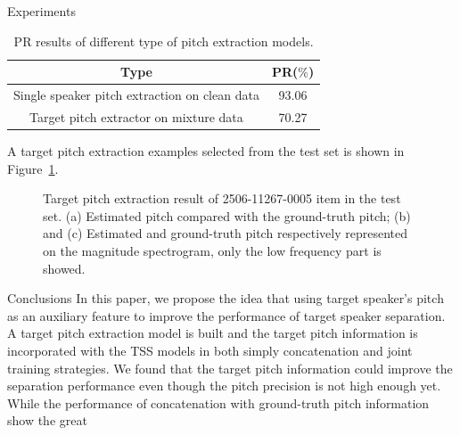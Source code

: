 \documentclass[final]{beamer}
\newlength{\colwidth}
\begin{document}
\begin{frame}[t]
\begin{columns}[t]
\begin{column}{\colwidth}
\begin{block}{Experiments}
                    \begin{table}[htbp]
                        \centering
                        \begin{tabular}{c|c}
                            \toprule
                            Type                                          & PR($\%$) \\
                            \midrule
                            Single speaker pitch extraction on clean data & 93.06    \\
                            \midrule
                            Target pitch extractor on mixture data        & 70.27    \\
                            \bottomrule
                        \end{tabular}
                        \caption{PR results of different type of pitch extraction models.}
                        \label{tab:pitch result}
                    \end{table}

                    A target pitch extraction examples selected from the test set is shown in Figure~\ref{fig:pitch_1}.

                    \begin{figure}[t]

                        \caption{Target pitch extraction result of 2506-11267-0005 item in the test set. (a) Estimated pitch compared with the ground-truth pitch; (b) and (c) Estimated and ground-truth pitch respectively represented on the magnitude spectrogram, only the low frequency part is showed. }
                        \label{fig:pitch_1}
                    \end{figure}
                \end{block}


                \begin{block}{Conclusions}
                    In this paper, we propose the idea that using target speaker's pitch as an auxiliary feature to improve the performance of target speaker separation. A target pitch extraction model is built and the target pitch information is incorporated with the TSS models in both simply concatenation and joint training strategies. We found that the target pitch information could improve the separation performance even though the pitch precision is not high enough yet. While the performance of concatenation with ground-truth pitch information show the great
                \end{block}
            \end{column}


\end{columns}
\end{frame}
\end{document}
